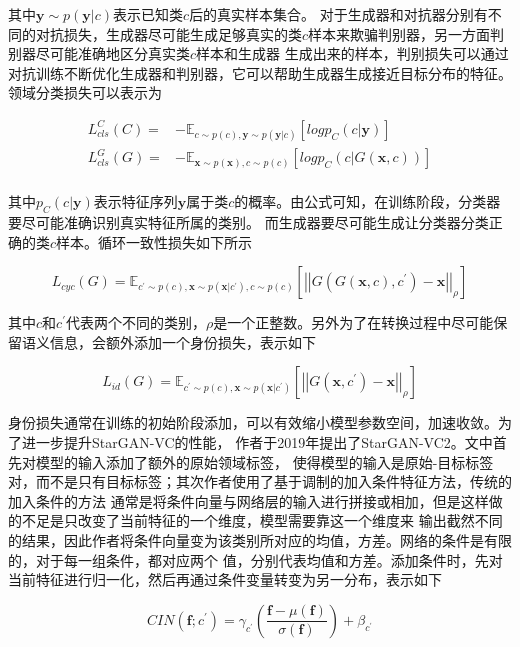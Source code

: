 其中$\mathbf{y}\sim p(\mathbf{y}|c)$表示已知类$c$后的真实样本集合。
对于生成器和对抗器分别有不同的对抗损失，生成器尽可能生成足够真实的类$c$样本来欺骗判别器，另一方面判别器尽可能准确地区分真实类$c$样本和生成器
生成出来的样本，判别损失可以通过对抗训练不断优化生成器和判别器，它可以帮助生成器生成接近目标分布的特征。
领域分类损失可以表示为

\begin{align}
    L^C_{cls}(C) = & -\mathbb{E}_{c\sim p(c),\mathbf{y}\sim p(\mathbf{y}|c)}\left[ log p_C(c|\mathbf{y}) \right] \\
    L^G_{cls}(G) = & -\mathbb{E}_{\mathbf{x}\sim p(\mathbf{x}),c\sim p(c)}\left[ log p_C(c|G(\mathbf{x},c)) \right] \\
\end{align}

其中$p_C(c|\mathbf{y})$表示特征序列$\mathbf{y}$属于类$c$的概率。由公式可知，在训练阶段，分类器要尽可能准确识别真实特征所属的类别。
而生成器要尽可能生成让分类器分类正确的类$c$样本。循环一致性损失如下所示

\begin{equation}
    L_{cyc}(G) = \mathbb{E}_{c^{'}\sim p(c),\mathbf{x}\sim p(\mathbf{x}|c^{'}),c\sim p(c)}\left[ \left| \left| G(G(\mathbf{x},c),c^{'})-\mathbf{x} \right| \right|_{\rho} \right]
\end{equation}

其中$c$和$c^{'}$代表两个不同的类别，$\rho$是一个正整数。另外为了在转换过程中尽可能保留语义信息，会额外添加一个身份损失，表示如下

\begin{equation}
    L_{id}(G) = \mathbb{E}_{c^{'}\sim p(c),\mathbf{x}\sim p(\mathbf{x}|c^{'})}\left[\left| \left| G(\mathbf{x},c^{'})-\mathbf{x} \right| \right|_{\rho} \right]
\end{equation}

身份损失通常在训练的初始阶段添加，可以有效缩小模型参数空间，加速收敛。为了进一步提升StarGAN-VC的性能，
作者于2019年提出了StarGAN-VC2\cite{kaneko2019stargan}。文中首先对模型的输入添加了额外的原始领域标签，
使得模型的输入是原始-目标标签对，而不是只有目标标签；其次作者使用了基于调制的加入条件特征方法，传统的加入条件的方法
通常是将条件向量与网络层的输入进行拼接或相加，但是这样做的不足是只改变了当前特征的一个维度，模型需要靠这一个维度来
输出截然不同的结果，因此作者将条件向量变为该类别所对应的均值，方差。网络的条件是有限的，对于每一组条件，都对应两个
值，分别代表均值和方差。添加条件时，先对当前特征进行归一化，然后再通过条件变量转变为另一分布，表示如下

\begin{equation}
    CIN(\mathbf{f};c^{'})=\gamma_{c^{'}}(\frac{\mathbf{f}-\mu(\mathbf{f})}{\sigma(\mathbf{f})})+\beta_{c^{'}}
\end{equation}

